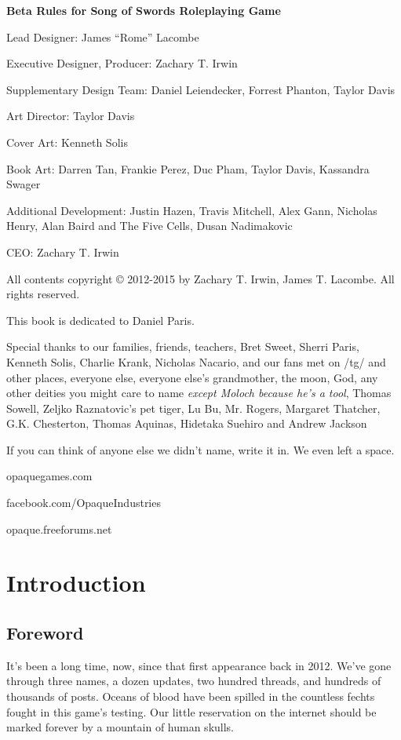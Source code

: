 \documentclass[oneside,11pt,english]{book}
\begin{document}
\newpage
\begin{center}
\vfill
\textbf{Beta Rules for Song of Swords Roleplaying Game}\par
Lead Designer: James “Rome” Lacombe\par
Executive Designer, Producer: Zachary T. Irwin\par
Supplementary Design Team: Daniel Leiendecker, Forrest Phanton, Taylor Davis\par
Art Director: Taylor Davis\par
Cover Art: Kenneth Solis\par
Book Art: Darren Tan, Frankie Perez, Duc Pham, Taylor Davis, Kassandra Swager\par


Additional Development: Justin Hazen, Travis Mitchell, Alex Gann, Nicholas Henry, Alan Baird and The Five Cells, Dusan Nadimakovic\par
CEO: Zachary T. Irwin\par


All contents copyright © 2012-2015 by Zachary T. Irwin, James T. Lacombe. All rights reserved.


This book is dedicated to Daniel Paris.
\vfill

Special thanks to our families, friends, teachers, Bret Sweet, Sherri Paris, Kenneth Solis, Charlie Krank, Nicholas Nacario, and our fans met on /tg/ and other places, everyone else, everyone else’s grandmother, the moon, God, any other deities you might care to name \textit{except Moloch because he’s a tool}, Thomas Sowell, Zeljko Raznatovic’s pet tiger, Lu Bu, Mr. Rogers, Margaret Thatcher, G.K. Chesterton, Thomas Aquinas, Hidetaka Suehiro and Andrew Jackson

\vspace{1cm}
If you can think of anyone else we didn’t name, write it in. We even left a space. 

\vfill
opaquegames.com\par
facebook.com/OpaqueIndustries\par
opaque.freeforums.net\par
\end{center}
\clearpage
\tableofcontents%
\mainmatter
\chapter{Introduction}\label{ch:intro}
\newpage
\section*{Foreword}
It’s been a long time, now, since that first appearance back in 2012. We’ve gone through three names, a dozen updates, two hundred threads, and hundreds of thousands of posts. Oceans of blood have been spilled in the countless fechts fought in this game’s testing. Our little reservation on the internet should be marked forever by a mountain of human skulls.
\end{document}
